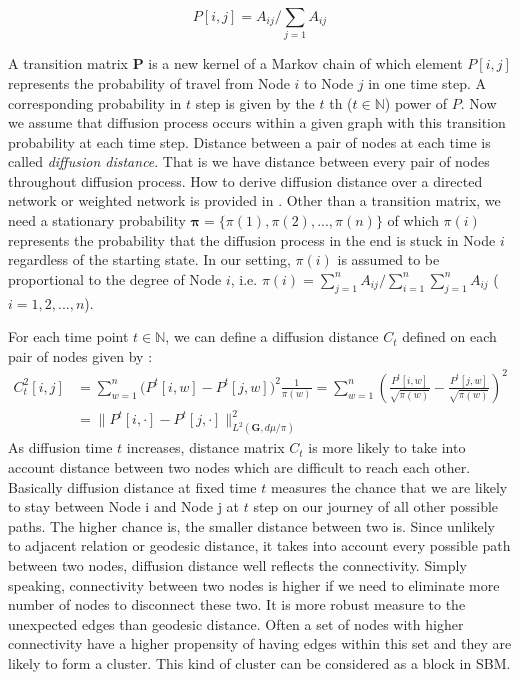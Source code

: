 \documentclass[12pt]{article}
\theoremstyle{definition}
\begin{document}
\begin{equation}
P[i,j] = A_{ij} \big/ \sum\limits_{j=1} A_{ij}
\end{equation}
	
A transition matrix $\mathbf{P}$ is a new kernel of a Markov chain of which element $P[i,j]$ represents the probability of travel from Node $i$ to Node $j$ in one time step. A corresponding probability in $t$ step is given by the $t$ th ($t \in \mathbb{N}$) power of $P$. Now we assume that diffusion process occurs within a given graph with this transition probability at each time step. Distance between a pair of nodes at each time is called \textit{diffusion distance}. That is we have distance between every pair of nodes throughout diffusion process. How to derive diffusion distance over a directed network or weighted network is provided in \cite{tang2010graph}. Other than a transition matrix, we need a stationary probability $\boldsymbol{\pi} = \{\pi(1), \pi(2), ... , \pi(n) \}$ of which $\pi(i)$ represents the probability that the diffusion process in the end is stuck in Node $i$ regardless of the starting state. In our setting, $\pi(i)$ is assumed to be proportional to the degree of Node $i$, i.e. $\pi(i) = \sum\limits_{j=1}^{n} A_{ij} \big/ \sum\limits_{i=1}^{n}\sum\limits_{j=1}^{n} A_{ij}$ ($i=1,2,..., n$).   
	
For each time point $t \in \mathbb{N}$, we can define a diffusion distance $C_{t}$ defined on each pair of nodes given by :	
\begin{equation}
\label{eq:diffusion}
\begin{split}
C^2_{t}[i,j] & = \sum\limits_{w =1}^{n} \big( P^{t}[i,w] - P^{t}[j,w]  \big)^{2} \frac{1}{\pi(w)} = \sum\limits_{w=1}^{n} \left(  \frac{P^{t}[i,w]}{\sqrt{\pi(w)}} - \frac{P^{t}[j,w]}{\sqrt{\pi(w)}}   \right)^2 \\ & = \parallel P^{t}[i, \cdot] - P^{t}[j, \cdot]  \parallel^2_{L^{2}(\boldsymbol{G}, d\mu / \pi)  }
\end{split}
\end{equation}
As diffusion time $t$ increases, distance matrix $C_{t}$ is more likely to take into account distance between two nodes which are difficult to reach each other. Basically diffusion distance at fixed time $t$ measures the chance that we are likely to stay between Node i and Node j at $t$ step on our journey of all other possible paths. The higher chance is, the smaller distance between two is. Since unlikely to adjacent relation or geodesic distance, it takes into account every possible path between two nodes, diffusion distance well reflects the connectivity. Simply speaking, connectivity between two nodes is higher if we need to eliminate more number of nodes to disconnect these two. It is more robust measure to the unexpected edges than geodesic distance. Often a set of nodes with higher connectivity have a higher propensity of having edges within this set and they are likely to form a cluster. This kind of cluster can be considered as a block in SBM. 
	
\end{document}
